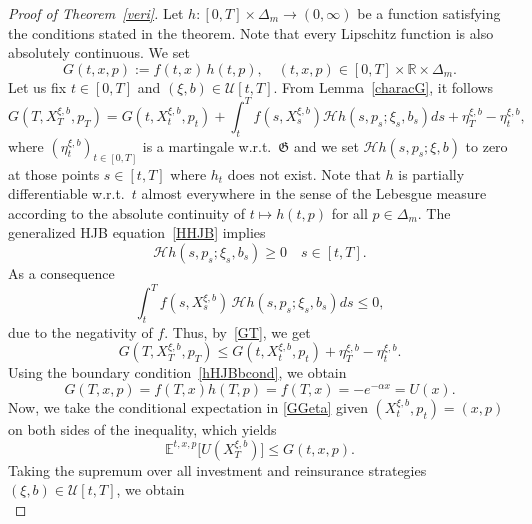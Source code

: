 \documentclass[reqno, 11pt]{amsart}%
\newcommand{\R}{\mathbb{R}}
\newcommand{\Eop}{\mathbb{E}}
\newcommand{\stprT}[1]{(#1_t)_{t\in[0,T]}}
\newcommand{\stT}{{s\in[t,T]}}
\theoremstyle{definition}
\numberwithin{equation}{section} \numberwithin{theorem}{section}
\begin{document}
\begin{proof}[Proof of Theorem~\ref{veri}]
   Let $h:[0,T]\times\Delta_m\to(0,\infty)$ be a function satisfying the conditions stated in the theorem. Note that every Lipschitz function is also absolutely continuous. We set
   \begin{equation*}
   G(t,x,p) := f(t,x)\,h(t,p), \quad (t,x,p)\in[0,T]\times\R\times\Delta_m.
   \end{equation*}
   Let us fix $t\in[0,T]$ and $(\xi,b)\in \mathcal U[t,T]$.
   From Lemma~\ref{characG}, it follows 
   \begin{equation}\label{GT}
   G(T,X^{\xi,b}_T,p_T) = G(t,X^{\xi,b}_t,p_t) + \int_t^T f(s,X^{\xi,b}_s)\mathcal{H} h(s,p_s;\xi_s,b_s)ds + \eta^{\xi,b}_T - \eta^{\xi,b}_t ,
   \end{equation}
   where $\stprT{\eta^{\xi,b}}$ is a martingale w.r.t.\ ${\mathfrak G}$ and we set $\mathcal{H} h(s,p_s;\xi,b)$ to zero at those points $s\in[t,T]$ where $h_t$ does not exist. Note that $h$ is partially differentiable w.r.t.\ $t$ almost everywhere in the sense of the Lebesgue measure according to the absolute continuity of $t\mapsto h(t,p)$ for all $p\in\Delta_m$.
   The generalized HJB equation~\eqref{HHJB} implies 
   \begin{equation*}
   \mathcal{H} h(s,p_s;\xi_s,b_s)\ge0\quad\stT.  %
   \end{equation*}
   As a consequence
   \begin{equation*}
   \int_t^T f(s,X^{\xi,b}_s)\,\mathcal{H} h(s,p_s;\xi_s,b_s) ds\le 0,
   \end{equation*}
   due to the negativity of  $f$. Thus, by~\eqref{GT}, we get
   \begin{equation}\label{GGeta}
   G(T,X^{\xi,b}_T,p_T)\le G(t,X^{\xi,b}_t,p_t) + \eta^{\xi,b}_T-\eta^{\xi,b}_t.
   \end{equation}
   Using the boundary condition~\eqref{hHJBbcond}, we obtain
   \begin{equation*}
   G(T,x,p) = f(T,x)h(T,p) = f(T,x) = -e^{-\alpha x}=U(x).
   \end{equation*}
   Now, we take the conditional expectation in \eqref{GGeta} given $(X^{\xi,b}_t,p_t)=(x,p)$ on both sides of the inequality, which yields
   \begin{equation*}
   \Eop^{t,x,p}\big[U(X^{\xi,b}_T)\big]\le G(t,x,p).
   \end{equation*}
   Taking the supremum over all investment and reinsurance strategies $(\xi,b)\in \mathcal U[t,T]$, we obtain 
   \begin{equation}\label{VG}

\end{equation}
\end{proof}
\end{document}
